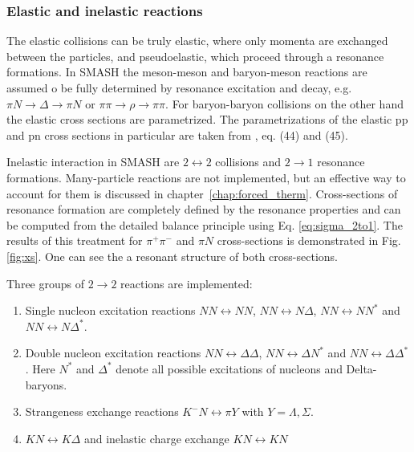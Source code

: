 \subsubsection{Elastic and inelastic reactions}

The elastic collisions can be truly elastic, where only momenta are exchanged
between the particles, and pseudoelastic, which proceed through a resonance
formations. In SMASH the meson-meson and baryon-meson reactions are assumed o be fully
determined by resonance excitation and decay,  e.g. $\pi N \to \Delta \to \pi N$
 or $\pi\pi \to \rho \to \pi\pi$. For baryon-baryon collisions on the other
hand the elastic cross sections are parametrized. The parametrizations of
the elastic pp and pn cross sections in particular are taken from
\cite{Weil:2013mya}, eq. (44) and (45).

Inelastic interaction in SMASH are $2 \leftrightarrow 2$ collisions
and $2 \to 1$ resonance formations. Many-particle reactions are not implemented,
but an effective way to account for them is discussed in
chapter~\ref{chap:forced_therm}. Cross-sections of resonance formation
are completely defined by the resonance properties and can be computed
from the detailed balance principle using Eq. \ref{eq:sigma_2to1}. The results of this
treatment for $\pi^+\pi^-$ and $\pi N$ cross-sections is demonstrated in Fig. \ref{fig:xs}.
One can see the a resonant structure of both cross-sections.

Three groups of $2 \to 2$ reactions are implemented:

\begin{enumerate}
  \item Single nucleon excitation reactions $NN\leftrightarrow NN$,
        $NN\leftrightarrow N\Delta$, $NN\leftrightarrow NN^*$ and $NN\leftrightarrow N\Delta^*$.
  \item Double nucleon excitation reactions $NN\leftrightarrow\Delta\Delta$,
        $NN\leftrightarrow\Delta N^*$ and $NN\leftrightarrow\Delta\Delta^*$.
        Here $N^*$ and $\Delta^*$ denote all possible excitations of nucleons
        and Delta-baryons.
  \item Strangeness exchange reactions $K^- N \leftrightarrow \pi Y$ with $Y = \Lambda, \Sigma$.
  \item $KN \leftrightarrow K\Delta$ and inelastic charge exchange $KN \leftrightarrow KN$
\end{enumerate}

